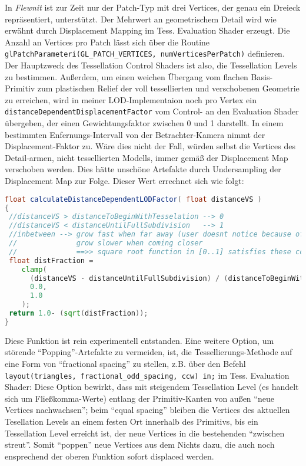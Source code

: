 	In \emph{Flewnit} ist zur Zeit nur der Patch-Typ mit drei Vertices, der genau ein Dreieck repräsentiert,
	unterstützt. Der Mehrwert an geometrischem Detail wird wie erwähnt durch Displacement Mapping
	im Tess. Evaluation Shader erzeugt. Die Anzahl an Vertices pro Patch lässt sich über die
	Routine \lstinline|glPatchParameteri(GL_PATCH_VERTICES, numVerticesPerPatch)| definieren.\\
	
	
	Der Hauptzweck des Tessellation Control Shaders ist also, die Tessellation Levels zu bestimmen.
	Außerdem, um einen weichen Übergang vom flachen Basis-Primitiv zum plastischen Relief der voll tessellierten
	und verschobenen Geometrie zu erreichen, wird in meiner LOD-Implementaion noch pro Vertex ein 
	\lstinline|distanceDependentDisplacementFactor| vom Control- an den Evaluation Shader übergeben, der einen 
	Gewichtungsfaktor zwischen 0 und 1 darstellt. In einem bestimmten Enfernungs-Intervall von der Betrachter-Kamera nimmt 
	der Displacement-Faktor zu. Wäre dies nicht der Fall, würden selbst die Vertices des Detail-armen, 
	nicht tessellierten Modells, immer gemäß der Displacement Map verschoben werden. Dies hätte 
	unschöne Artefakte durch Undersampling der Displacement Map zur Folge. 
	Dieser Wert errechnet sich wie folgt:
	\begin{lstlisting}[language=GLSL]
float calculateDistanceDependentLODFactor( float distanceVS )
{
 //distanceVS > distanceToBeginWithTesselation --> 0
 //distanceVS < distanceUntilFullSubdivision   --> 1
 //inbetween --> grow fast when far away (user doesnt notice because of distance), 
 //				 grow slower when coming closer
 //				 ==>> square root function in [0..1] satisfies these conditions
 float distFraction = 
    clamp(
      (distanceVS - distanceUntilFullSubdivision) / (distanceToBeginWithTesselation - distanceUntilFullSubdivision),
      0.0,
      1.0 
    );
 return 1.0- (sqrt(distFraction));
}
	\end{lstlisting}
	Diese Funktion ist rein experimentell entstanden. Eine weitere Option, um störende "`Popping"'-Artefakte
	zu vermeiden, ist, die Tessellierungs-Methode auf eine Form von "`fractional spacing"' zu stellen,
	z.B. über den Befehl \lstinline|layout(triangles, fractional_odd_spacing, ccw) in;| im Tess. Evaluation Shader:
	Diese Option bewirkt, dass mit steigendem Tessellation Level (es handelt sich um Fließkomma-Werte)
	entlang der Primitiv-Kanten von außen "`neue Vertices nachwachsen"'; beim "`equal spacing"' bleiben die
	Vertices des aktuellen Tesellation Levels an einem festen Ort innerhalb des Primitivs, bis ein
	Tessellation Level erreicht ist, der neue Vertices in die bestehenden "`zwischen streut"'. Somit
	"`poppen"' neue Vertices aus dem Nichts dazu, die auch noch ensprechend der oberen Funktion sofort displaced werden.\\
	
